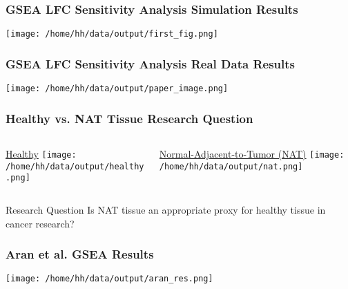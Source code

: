\documentclass[11pt]{beamer}
\begin{document}
\begin{frame}
  \frametitle{GSEA LFC Sensitivity Analysis Simulation Results}

  \begin{center}
    \texttt{[image: /home/hh/data/output/first\_fig.png]}
  \end{center}
\end{frame}

\begin{frame}
  \frametitle{GSEA LFC Sensitivity Analysis Real Data Results}

  \begin{center}
    \texttt{[image: /home/hh/data/output/paper\_image.png]}
  \end{center}
  
\end{frame}

\begin{frame}
   \frametitle{Healthy vs. NAT Tissue Research Question}
   \begin{columns}
     \begin{column}{0.5\textwidth}
      \begin{center}
        \underline{Healthy}
        \texttt{[image: /home/hh/data/output/healthy.png]}
      \end{center}
    \end{column}
    \vrule{}
    \begin{column}{0.5\textwidth}  %
      \begin{center}
        \underline{Normal-Adjacent-to-Tumor (NAT)}
        \texttt{[image: /home/hh/data/output/nat.png]}
      \end{center}
    \end{column}
   \end{columns}
   \begin{exampleblock}{Research Question}
     Is NAT tissue an appropriate proxy for healthy tissue in cancer research?
   \end{exampleblock}
\end{frame}

\begin{frame}
  \frametitle{Aran et al. GSEA Results}
  \begin{center}
    \texttt{[image: /home/hh/data/output/aran\_res.png]}
  \end{center}
\end{frame}
\end{document}
